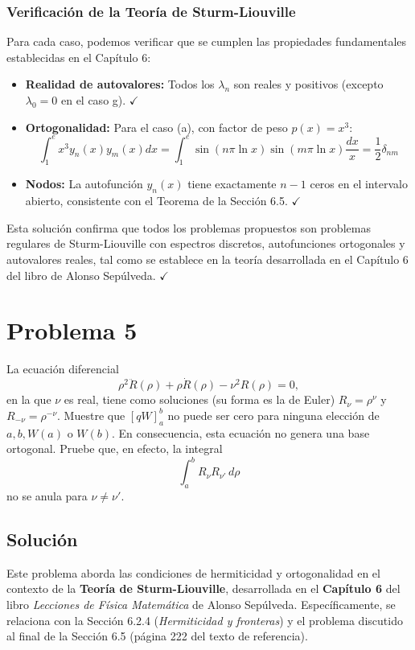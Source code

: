 \documentclass[a4paper]{article}
\begin{document}
\subsubsection{Verificación de la Teoría de Sturm-Liouville}

Para cada caso, podemos verificar que se cumplen las propiedades fundamentales establecidas en el Capítulo 6:

\begin{itemize}
    \item \textbf{Realidad de autovalores:} Todos los $\lambda_n$ son reales y positivos (excepto $\lambda_0 = 0$ en el caso g). $\checkmark$
    
    \item \textbf{Ortogonalidad:} Para el caso (a), con factor de peso $p(x) = x^3$:
    $$
    \int_1^e x^3 y_n(x) y_m(x) dx = \int_1^e \sin(n\pi \ln x) \sin(m\pi \ln x) \frac{dx}{x} = \frac{1}{2} \delta_{nm}
    $$
    
    \item \textbf{Nodos:} La autofunción $y_n(x)$ tiene exactamente $n-1$ ceros en el intervalo abierto, consistente con el Teorema de la Sección 6.5. $\checkmark$
\end{itemize}

Esta solución confirma que todos los problemas propuestos son problemas regulares de Sturm-Liouville con espectros discretos, autofunciones ortogonales y autovalores reales, tal como se establece en la teoría desarrollada en el Capítulo 6 del libro de Alonso Sepúlveda. $\checkmark$



\section{Problema 5}
La ecuación diferencial
$$
\rho^2 \ddot{R}(\rho) + \rho \dot{R}(\rho) - \nu^2 R(\rho) = 0,
$$
en la que $\nu$ es real, tiene como soluciones (su forma es la de Euler) $R_\nu = \rho^\nu$ y $R_{-\nu} = \rho^{-\nu}$. Muestre que $[qW]_a^b$ no puede ser cero para ninguna elección de $a, b, W(a)$ o $W(b)$. En consecuencia, esta ecuación no genera una base ortogonal. Pruebe que, en efecto, la integral
$$
\int_a^b R_\nu R_{\nu'} \, d\rho
$$
no se anula para $\nu \neq \nu'$.

\subsection{Solución}

Este problema aborda las condiciones de hermiticidad y ortogonalidad en el contexto de la \textbf{Teoría de Sturm-Liouville}, desarrollada en el \textbf{Capítulo 6} del libro \textit{Lecciones de Física Matemática} de Alonso Sepúlveda. Específicamente, se relaciona con la Sección 6.2.4 (\textit{Hermiticidad y fronteras}) y el problema discutido al final de la Sección 6.5 (página 222 del texto de referencia).
\end{document}
